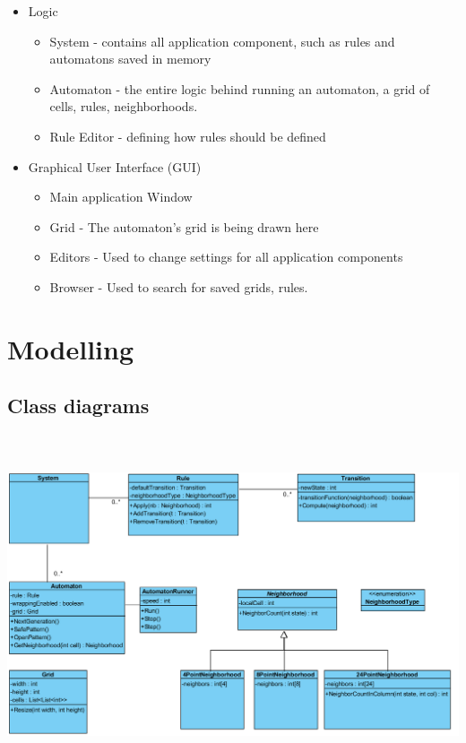 \documentclass{article}
\begin{document}
\begin{itemize}
	\item Logic
		\begin{itemize}
			\item System - contains all application component, such as
			rules and automatons saved in memory
			\item Automaton - the entire logic behind running an automaton,
				a grid of cells, rules, neighborhoods.
			\item Rule Editor - defining how rules should be defined
		\end{itemize}		
	\item Graphical User Interface (GUI)

		\begin{itemize}
			\item Main application Window
			\item Grid - The automaton's grid is being drawn here
			\item Editors - Used to change settings for all application components
			\item Browser - Used to search for saved grids, rules.
		\end{itemize}		
		
\end{itemize}






\section{Modelling}

	\subsection{Class diagrams}
	\hspace{-60pt}
	\includegraphics[width=180mm, height=100mm]{images/class_d.png} \\
	
\end{document}
